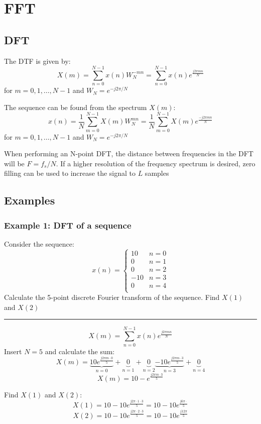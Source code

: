 \section{FFT}
\subsection{DFT}
The DTF is given by:
$$X(m)=\sum_{n=0}^{N-1}x(n)W_{N}^{-m n}=\sum_{n=0}^{N-1}x(n)e^{\frac{j2\pi m n}{N}}$$
for $m=0,1,\dots,N-1$ and $W_N=e^{-j2\pi/N}$

The sequence can be found from the spectrum $X(m)$:
$$x(n)=\frac{1}{N}\sum_{m=0}^{N-1}X(m)W_{N}^{m n}=\frac{1}{N}\sum_{m=0}^{N-1}X(m)e^{\frac{-j2\pi m n}{N}}$$
for $m=0,1,\dots,N-1$ and $W_N=e^{-j2\pi/N}$

When performing an N-point DFT, the distance between frequencies in the DFT will be $F=f_s/N$. If a higher resolution of the frequency spectrum is desired, zero filling can be used to increase the signal to $L$ samples
\subsection{Examples}
\subsubsection{Example 1: DFT of a sequence}
Consider the sequence:
$$x(n)=\begin{cases}
  10&n=0\\ 
  0&n=1\\
  0&n=2\\
  -10&n=3\\
  0&n=4\\
\end{cases}$$
Calculate the 5-point discrete Fourier transform of the sequence.
Find $X(1)$ and $X(2)$

\rule{\textwidth}{0.5pt}
$$X(m)=\sum_{n=0}^{N-1}x(n)e^{\frac{j2\pi m n}{N}}$$
Insert $N=5$ and calculate the sum:
$$X(m)=\underbrace{10e^{\frac{j2\pi m \cdot 0}{5}}}_{n=0}+\underbrace{0}_{n=1}+\underbrace{0}_{n=2}\underbrace{-10e^{\frac{j2\pi m \cdot 3}{5}}}_{n=3}+\underbrace{0}_{n=4}$$
$$X(m)=10-e^{\frac{j2\pi m \cdot 3}{5}}$$

Find $X(1)$ and $X(2)$:
$$X(1)=10-10e^{\frac{j2\pi\cdot 1 \cdot 3}{5}}=10-10e^{\frac{j6\pi\cdot}{5}}$$
$$X(2)=10-10e^{\frac{j2\pi \cdot2 \cdot 3}{5}}=10-10e^{\frac{j12\pi}{5}}$$

